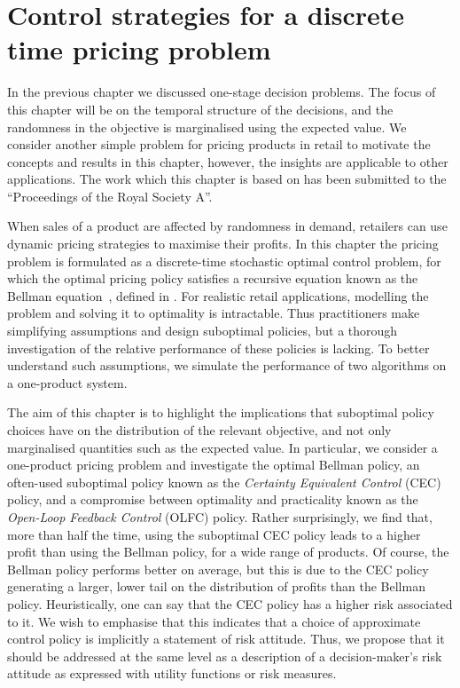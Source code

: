 \documentclass[main.tex]{subfiles}
\begin{document}
\chapter{Control strategies for a discrete time pricing
  problem}\label{ch:discrete_control}

In the previous chapter we discussed one-stage decision problems.
The focus of this chapter
will be on the temporal structure of the
decisions, and the randomness in the objective is marginalised using
the expected value.
We consider another simple problem for pricing
products in retail to motivate the concepts and results in this
chapter, however, the insights are applicable to other applications.
The work which this chapter is based on has been submitted to
the ``Proceedings of the Royal Society A''.

When sales of a product are affected by randomness in demand,
retailers can use dynamic pricing strategies to maximise their
profits. In this chapter the pricing problem is formulated as a
discrete-time stochastic optimal control problem, for which the
optimal pricing policy satisfies a recursive equation known as the
Bellman equation~\citep{bertsekas2005dynamic}, defined in
.
For realistic retail applications, modelling the problem
and solving it to optimality is intractable. Thus practitioners make
simplifying assumptions and design suboptimal policies, but a thorough
investigation of the relative performance of these policies is
lacking. To better understand such assumptions, we simulate the
performance of two algorithms on a one-product system.

The aim of this chapter is to highlight the implications that
suboptimal policy
choices have on the distribution of the relevant objective, and not
only marginalised quantities such as the expected value.
In particular, we consider a one-product pricing problem and
investigate the optimal Bellman policy, an often-used suboptimal
policy known as the \emph{Certainty Equivalent Control} (CEC)
policy, and a compromise between optimality and practicality known as the
\emph{Open-Loop Feedback Control} (OLFC) policy.
Rather surprisingly, we find that, more than half the
time, using the suboptimal CEC policy
leads to a higher profit than using the Bellman policy, for a wide
range of products. Of course, the
Bellman policy performs better on average, but
this is due to the CEC policy generating a larger, lower tail on the
distribution of profits than the Bellman policy.
Heuristically, one can say that the CEC policy has a higher risk
associated to it. We wish to emphasise that this indicates that a
choice of approximate control policy is implicitly a statement of
risk attitude. Thus, we propose that it should be addressed at the same level as a
description of a decision-maker's risk attitude as expressed with
utility functions or risk measures.
\end{document}
